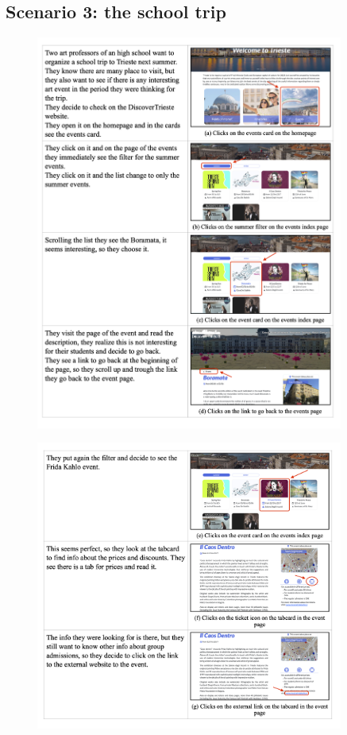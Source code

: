 \documentclass[table, 12pt]{article}
\begin{document}
\subsection{Scenario 3: the school trip}
\begin{figure}[H]
    \begin{center}
        \includegraphics[width=0.9\textwidth]{assets/Scenarios/scenario3-1.png}
    \end{center}
\end{figure}

\begin{figure}[H]
    \begin{center}
        \includegraphics[width=0.9\textwidth]{assets/Scenarios/scenario3-2.png}
    \end{center}
\end{figure}
\end{document}
